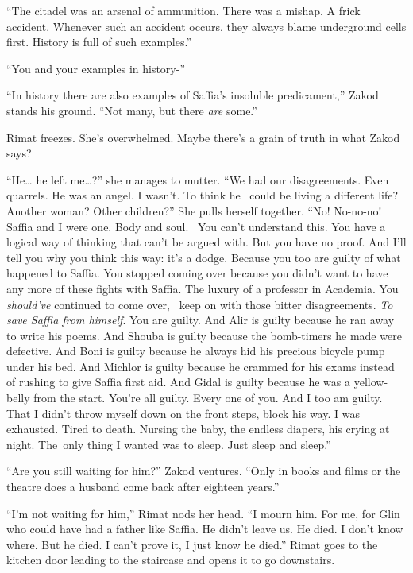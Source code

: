 \documentclass[twoside,11pt]{book}
\begin{document}
``The citadel was an arsenal of ammunition. There was a mishap. A frick accident. Whenever such an accident
occurs, they always blame underground cells first. History is full of such examples.''

``You and your examples in history-''

``In history there are also examples of Saffia's insoluble predicament,'' Zakod stands his
ground. ``Not many, but there \textit{are} some.''

Rimat freezes. She's overwhelmed. Maybe there's a grain of truth in what Zakod says? \

``He{\dots} he left me{\dots}?'' she manages to mutter. ``We had our disagreements. Even quarrels. He was
an angel. I wasn't. To think he \ could be living a different life? Another woman? Other children?'' She
pulls herself together. ``No! No-no-no! Saffia and I were one. Body and soul.~ You can't understand this.
You have a logical way of thinking that can't be argued with. But you have no proof. And I'll tell you why you think
this way: it's a dodge. Because you too are guilty of what happened to Saffia. You stopped coming over because you
didn't want to have any more of these fights with Saffia. The luxury of a professor in Academia. You \textit{should've}
continued to come over, \ keep on with those bitter disagreements. \textit{To save Saffia from himself}. You are
guilty. And Alir is guilty because he ran away to write his poems. And Shouba is guilty because the bomb-timers he made
were defective. And Boni is guilty because he always hid his precious bicycle pump under his bed. And Michlor is guilty
because he crammed for his exams instead of rushing to give Saffia first aid. And Gidal is guilty because he was a
yellow-belly from the start. You're all guilty. Every one of you. And I too am guilty. That I didn't throw myself down
on the front steps, block his way. I was exhausted. Tired to death. Nursing the baby, the endless diapers, his crying
at night. The~only thing I wanted was to sleep. Just sleep and sleep.''

``Are you still waiting for him?'' Zakod ventures. ``Only in books and films or
the theatre does a husband come back after eighteen years.''

``I'm not waiting for him,'' Rimat nods her head. ``I mourn him. For me, for Glin
who could have had a father like Saffia. He didn't leave us. He died. I don't know where. But he died. I can't prove
it, I just know he died.'' Rimat goes to the kitchen door leading to the staircase and opens it to go
downstairs.
\end{document}
